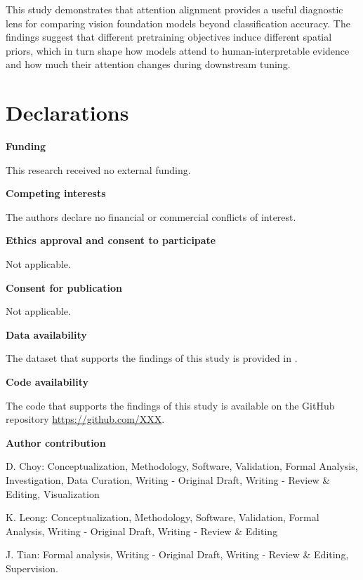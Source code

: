 \documentclass[lineno,pdflatex,sn-mathphys-num]{sn-jnl}%
\theoremstyle{thmstyleone}%
\theoremstyle{thmstyletwo}%
\theoremstyle{thmstylethree}%
\begin{document}
This study demonstrates that attention alignment provides a useful diagnostic lens for comparing vision foundation models beyond classification accuracy. The findings suggest that different pretraining objectives induce different spatial priors, which in turn shape how models attend to human-interpretable evidence and how much their attention changes during downstream tuning. 

\backmatter


\section*{Declarations}

\textbf{Funding}

This research received no external funding. \newline

\noindent\textbf{Competing interests}

The authors declare no financial or commercial conflicts of interest. \newline

\noindent\textbf{Ethics approval and consent to participate}

Not applicable.\newline

\noindent\textbf{Consent for publication}

Not applicable.\newline

\noindent\textbf{Data availability }

The dataset that supports the findings of this study is provided in \cite{Barz21WikiChurches}.\newline

\noindent\textbf{Code availability }

The code that supports the findings of this study is available on the GitHub repository \url{https://github.com/XXX}.\newline

\noindent\textbf{Author contribution}

D. Choy: Conceptualization, Methodology, Software, Validation, Formal Analysis, Investigation, Data Curation, Writing - Original Draft, Writing - Review \& Editing, Visualization

K. Leong: Conceptualization, Methodology, Software, Validation, Formal Analysis, Writing - Original Draft, Writing - Review \& Editing

J. Tian: Formal analysis, Writing - Original Draft, Writing - Review \& Editing, Supervision.
\end{document}

